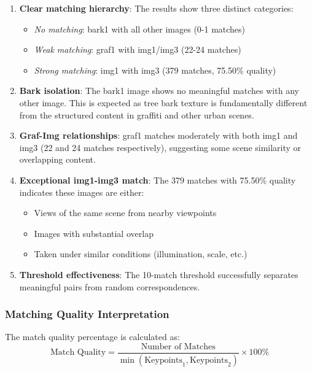 \documentclass[12pt,a4paper]{article}
\begin{document}
\begin{enumerate}
    \item \textbf{Clear matching hierarchy}: The results show three distinct categories:
    \begin{itemize}
        \item \textit{No matching}: bark1 with all other images (0-1 matches)
        \item \textit{Weak matching}: graf1 with img1/img3 (22-24 matches)
        \item \textit{Strong matching}: img1 with img3 (379 matches, 75.50\% quality)
    \end{itemize}
    
    \item \textbf{Bark isolation}: The bark1 image shows no meaningful matches with any other image. This is expected as tree bark texture is fundamentally different from the structured content in graffiti and other urban scenes.
    
    \item \textbf{Graf-Img relationships}: graf1 matches moderately with both img1 and img3 (22 and 24 matches respectively), suggesting some scene similarity or overlapping content.
    
    \item \textbf{Exceptional img1-img3 match}: The 379 matches with 75.50\% quality indicates these images are either:
    \begin{itemize}
        \item Views of the same scene from nearby viewpoints
        \item Images with substantial overlap
        \item Taken under similar conditions (illumination, scale, etc.)
    \end{itemize}
    
    \item \textbf{Threshold effectiveness}: The 10-match threshold successfully separates meaningful pairs from random correspondences.
\end{enumerate}

\subsubsection{Matching Quality Interpretation}
The match quality percentage is calculated as:
\begin{equation}
\text{Match Quality} = \frac{\text{Number of Matches}}{\min(\text{Keypoints}_1, \text{Keypoints}_2)} \times 100\%
\end{equation}
\end{document}
